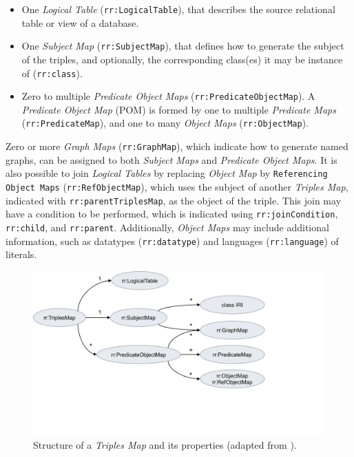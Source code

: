 \begin{itemize}
    \item One \textit{Logical Table} (\texttt{rr:LogicalTable}), that describes the source relational table or view of a database.
    \item One \textit{Subject Map} (\texttt{rr:SubjectMap}), that defines how to generate the subject of the triples, and optionally, the corresponding class(es) it may be instance of (\texttt{rr:class}).
    \item Zero to multiple \textit{Predicate Object Maps} (\texttt{rr:PredicateObjectMap}). A \textit{Predicate Object Map} (POM) is formed by one to multiple \textit{Predicate Maps} (\texttt{rr:PredicateMap}), and one to many \textit{Object Maps} (\texttt{rr:ObjectMap}).%
\end{itemize}

Zero or more \textit{Graph Maps} (\texttt{rr:GraphMap}), which indicate how to generate named graphs, can be assigned to both \textit{Subject Maps} and \textit{Predicate Object Maps}. 
It is also possible to join \textit{Logical Tables} by replacing \textit{Object Map} by \texttt{Referencing Object Maps} (\texttt{rr:RefObjectMap}), which uses the subject of another \textit{Triples Map}, indicated with \texttt{rr:parentTriplesMap}, as the object of the triple. 
This join may have a condition to be performed, which is indicated using \texttt{rr:joinCondition}, \texttt{rr:child}, and \texttt{rr:parent}. 
Additionally, \textit{Object Maps} may include additional information, such as datatypes (\texttt{rr:datatype}) and languages (\texttt{rr:language}) of literals. 

\begin{figure}[h]
\centering
\includegraphics[width=0.7\linewidth]{figures/chp2_r2rml_tm.pdf}
\caption[Structure of Triples Map from R2RML]{Structure of a \textit{Triples Map} and its properties (adapted from \cite{das2012r2rml}).}
\label{fig:chp2_r2rml-tm}
\end{figure}

